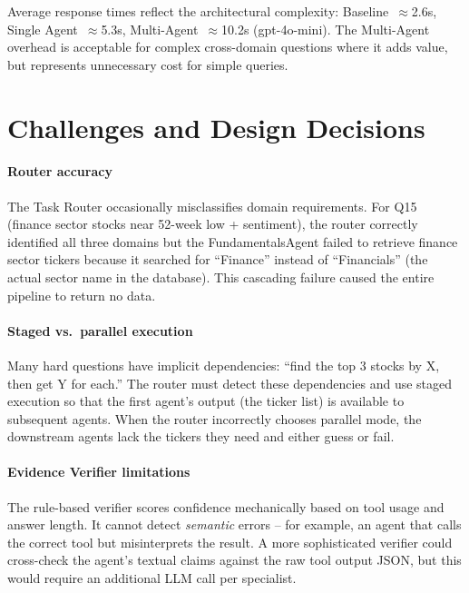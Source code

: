 \documentclass[conference]{IEEEtran}
\begin{document}
Average response times reflect the architectural complexity:
Baseline~$\approx$2.6s, Single Agent~$\approx$5.3s, Multi-Agent~$\approx$10.2s
(gpt-4o-mini).  The Multi-Agent overhead is acceptable for complex cross-domain
questions where it adds value, but represents unnecessary cost for simple queries.

\section{Challenges and Design Decisions}

\paragraph{Router accuracy}
The Task Router occasionally misclassifies domain requirements.  For Q15 (finance sector
stocks near 52-week low + sentiment), the router correctly identified all three domains
but the FundamentalsAgent failed to retrieve finance sector tickers because it searched
for ``Finance'' instead of ``Financials'' (the actual sector name in the database).
This cascading failure caused the entire pipeline to return no data.

\paragraph{Staged vs.\ parallel execution}
Many hard questions have implicit dependencies: ``find the top 3 stocks by X, then get
Y for each.''  The router must detect these dependencies and use staged execution so
that the first agent's output (the ticker list) is available to subsequent agents.
When the router incorrectly chooses parallel mode, the downstream agents lack the
tickers they need and either guess or fail.

\paragraph{Evidence Verifier limitations}
The rule-based verifier scores confidence mechanically based on tool usage and answer
length.  It cannot detect \emph{semantic} errors -- for example, an agent that calls
the correct tool but misinterprets the result.  A more sophisticated verifier could
cross-check the agent's textual claims against the raw tool output JSON, but this would
require an additional LLM call per specialist.
\end{document}
